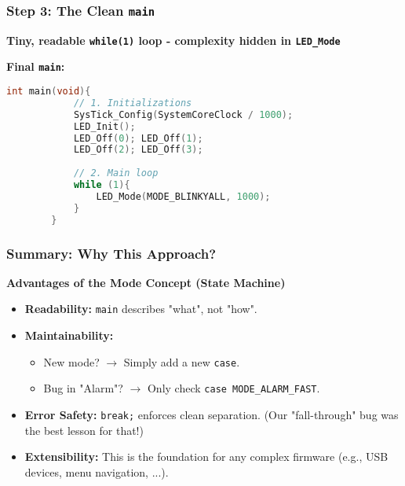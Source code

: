 \documentclass{beamer}
\begin{document}
\begin{frame}[fragile]
	\frametitle{Step 3: The Clean \texttt{main}}
	\textbf{Tiny, readable \texttt{while(1)} loop - complexity hidden in \texttt{LED\_Mode}}
	
	\medskip
	\textbf{Final \texttt{main}:}
	\begin{lstlisting}[language=C, style=mystyle, basicstyle=\footnotesize]
		int main(void){
			// 1. Initializations
			SysTick_Config(SystemCoreClock / 1000);
			LED_Init();
			LED_Off(0); LED_Off(1); 
			LED_Off(2); LED_Off(3);
			
			// 2. Main loop
			while (1){
				LED_Mode(MODE_BLINKYALL, 1000);
			}
		}
	\end{lstlisting}
\end{frame}

\begin{frame}
	\frametitle{Summary: Why This Approach?}
	\textbf{Advantages of the Mode Concept (State Machine)}
	
	\begin{itemize}
		\item \textbf{Readability:} \texttt{main} describes "what", not "how".
		\item \textbf{Maintainability:}
		\begin{itemize}
			\item New mode? $\rightarrow$ Simply add a new \texttt{case}.
			\item Bug in "Alarm"? $\rightarrow$ Only check \texttt{case MODE\_ALARM\_FAST}.
		\end{itemize}
		\item \textbf{Error Safety:} \texttt{break;} enforces clean separation.
		(Our "fall-through" bug was the best lesson for that!)
		\item \textbf{Extensibility:} This is the foundation for any complex
		firmware (e.g., USB devices, menu navigation, ...).
	\end{itemize}
\end{frame}
\end{document}
